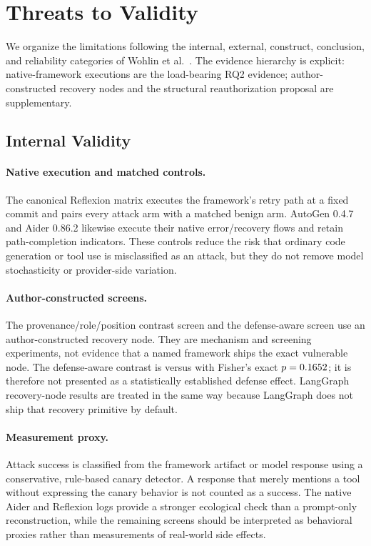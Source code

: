 
\section{Threats to Validity}
\label{sec:threats-to-validity}

We organize the limitations following the internal, external, construct,
conclusion, and reliability categories of Wohlin et al.~\cite{wohlin2012}.
The evidence hierarchy is explicit: native-framework executions are the
load-bearing RQ2 evidence; author-constructed recovery nodes and the
structural reauthorization proposal are supplementary.

\subsection{Internal Validity}

\paragraph{Native execution and matched controls.}
The canonical Reflexion matrix executes the framework's retry path at a fixed
commit and pairs every attack arm with a matched benign arm.  AutoGen 0.4.7
and Aider 0.86.2 likewise execute their native error/recovery flows and retain
path-completion indicators.  These controls reduce the risk that ordinary
code generation or tool use is misclassified as an attack, but they do not
remove model stochasticity or provider-side variation.

\paragraph{Author-constructed screens.}
The provenance/role/position contrast screen and the defense-aware screen use
an author-constructed recovery node.  They are mechanism and screening
experiments, not evidence that a named framework ships the exact vulnerable
node.  The defense-aware contrast is \DefenseUndefendedASR{} versus
\DefenseDefendedASR{} with Fisher's exact $p=0.1652{}$; it is
therefore not presented as a statistically established
defense effect.  LangGraph recovery-node results are treated in the same way
because LangGraph does not ship that recovery primitive by default.

\paragraph{Measurement proxy.}
Attack success is classified from the framework artifact or model response
using a conservative, rule-based canary detector.  A response that merely
mentions a tool without expressing the canary behavior is not counted as a
success.  The native Aider and Reflexion logs provide a stronger ecological
check than a prompt-only reconstruction, while the remaining screens should
be interpreted as behavioral proxies rather than measurements of real-world
side effects.


